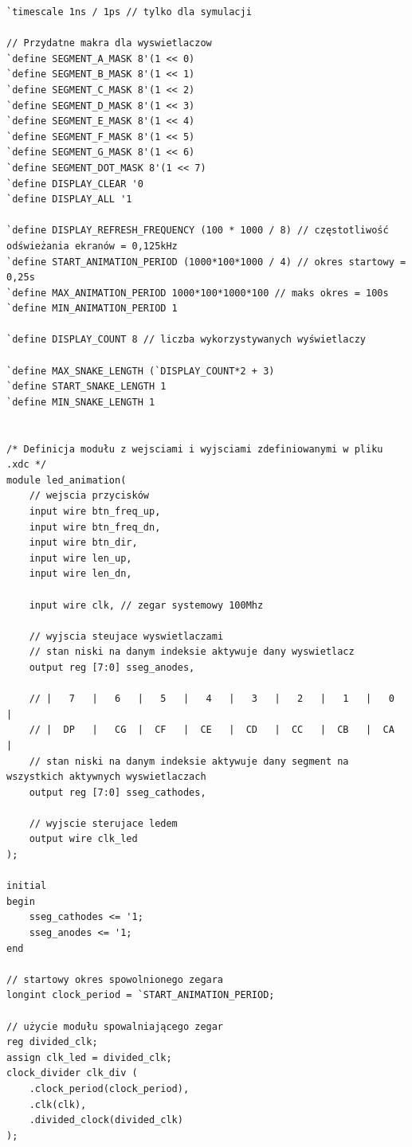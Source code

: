 \documentclass[a4paper]{article}
\begin{document}
\begin{verbatim}
`timescale 1ns / 1ps // tylko dla symulacji

// Przydatne makra dla wyswietlaczow
`define SEGMENT_A_MASK 8'(1 << 0)
`define SEGMENT_B_MASK 8'(1 << 1)
`define SEGMENT_C_MASK 8'(1 << 2)
`define SEGMENT_D_MASK 8'(1 << 3)
`define SEGMENT_E_MASK 8'(1 << 4)
`define SEGMENT_F_MASK 8'(1 << 5)
`define SEGMENT_G_MASK 8'(1 << 6)
`define SEGMENT_DOT_MASK 8'(1 << 7)
`define DISPLAY_CLEAR '0
`define DISPLAY_ALL '1

`define DISPLAY_REFRESH_FREQUENCY (100 * 1000 / 8) // częstotliwość odświeżania ekranów = 0,125kHz
`define START_ANIMATION_PERIOD (1000*100*1000 / 4) // okres startowy = 0,25s
`define MAX_ANIMATION_PERIOD 1000*100*1000*100 // maks okres = 100s
`define MIN_ANIMATION_PERIOD 1

`define DISPLAY_COUNT 8 // liczba wykorzystywanych wyświetlaczy

`define MAX_SNAKE_LENGTH (`DISPLAY_COUNT*2 + 3)
`define START_SNAKE_LENGTH 1
`define MIN_SNAKE_LENGTH 1


/* Definicja modułu z wejsciami i wyjsciami zdefiniowanymi w pliku .xdc */
module led_animation(
    // wejscia przycisków
    input wire btn_freq_up,
    input wire btn_freq_dn,
    input wire btn_dir,
    input wire len_up,
    input wire len_dn,
    
    input wire clk, // zegar systemowy 100Mhz
    
    // wyjscia steujace wyswietlaczami
    // stan niski na danym indeksie aktywuje dany wyswietlacz
    output reg [7:0] sseg_anodes,
    
    // |   7   |   6   |   5   |   4   |   3   |   2   |   1   |   0   |
    // |  DP   |   CG  |  CF   |  CE   |  CD   |  CC   |  CB   |  CA   |
    // stan niski na danym indeksie aktywuje dany segment na wszystkich aktywnych wyswietlaczach
    output reg [7:0] sseg_cathodes,
    
    // wyjscie sterujace ledem
    output wire clk_led
);

initial
begin
    sseg_cathodes <= '1;
    sseg_anodes <= '1;
end

// startowy okres spowolnionego zegara
longint clock_period = `START_ANIMATION_PERIOD;

// użycie modułu spowalniającego zegar
reg divided_clk;
assign clk_led = divided_clk;
clock_divider clk_div (
    .clock_period(clock_period),
    .clk(clk),
    .divided_clock(divided_clk)
);


\end{verbatim}
\end{document}
